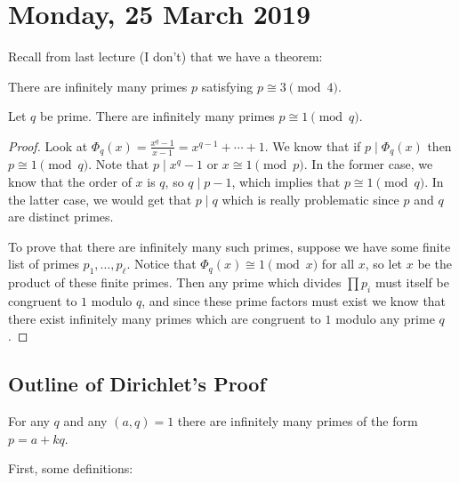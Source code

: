 
\section{Monday, 25 March 2019}

Recall from last lecture (I don't) that we have a theorem:

\begin{theorem*}
	There are infinitely many primes $p$ satisfying $p \cong 3 \pmod{4}$.
\end{theorem*}

\begin{lemma*}
	Let $q$ be prime. There are infinitely many primes $p \cong 1 \pmod{q}$.
\end{lemma*}

\begin{proof}
	Look at $\Phi_q(x) = \frac{x^q-1}{x-1} = x^{q-1} + \cdots + 1$.
	We know that if $p \mid \Phi_q(x)$ then $p \cong 1 \pmod{q}$.
	Note that $p \mid x^q - 1$ or $x \cong 1 \pmod{p}$.
	In the former case, we know that the order of $x$ is $q$, so $q \mid p-1$, 
	which implies that $p \cong 1 \pmod{q}$.
	In the latter case, we would get that $p \mid q$ which is really problematic 
	since $p$ and $q$ are distinct primes.

	To prove that there are infinitely many such primes, suppose we have some 
	finite list of primes $p_1, \dotsc, p_\ell$.
	Notice that $\Phi_q(x) \cong 1 \pmod{x}$ for all $x$, so let $x$ be
	the product of these finite primes. Then any prime which divides $\prod p_i$
	must itself be congruent to $1$ modulo $q$, and since these prime factors
	must exist we know that there exist infinitely many primes which are 
	congruent to $1$ modulo any prime $q$.
\end{proof}

\subsection*{Outline of Dirichlet's Proof}

\begin{theorem}
	For any $q$ and any $(a,q) = 1$ there are infinitely many primes of the form
	$p = a + kq$.
\end{theorem}

First, some definitions:

